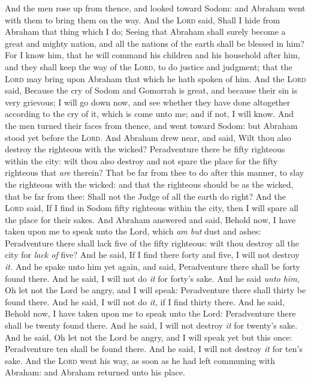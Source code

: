\documentclass[11pt,letterpaper,oneside]{memoir}
\begin{document}
And the men rose up from thence, and looked toward Sodom: and Abraham
went with them to bring them on the way. And the \textsc{Lord} said, Shall
I hide from Abraham that thing which I do; Seeing that Abraham shall
surely become a great and mighty nation, and all the nations of the
earth shall be blessed in him? For I know him, that he will command his
children and his household after him, and they shall keep the way of the
\textsc{Lord}, to do justice and judgment; that the \textsc{Lord} may bring
upon Abraham that which he hath spoken of him. And the \textsc{Lord} said,
Because the cry of Sodom and Gomorrah is great, and because their sin is
very grievous; I will go down now, and see whether they have done
altogether according to the cry of it, which is come unto me; and if
not, I will know. And the men turned their faces from thence, and went
toward Sodom: but Abraham stood yet before the \textsc{Lord}. And Abraham
drew near, and said, Wilt thou also destroy the righteous with the
wicked? Peradventure there be fifty righteous within the city: wilt thou
also destroy and not spare the place for the fifty righteous that
\emph{are} therein? That be far from thee to do after this manner, to
slay the righteous with the wicked: and that the righteous should be as
the wicked, that be far from thee: Shall not the Judge of all the earth
do right? And the \textsc{Lord} said, If I find in Sodom fifty righteous
within the city, then I will spare all the place for their sakes. And
Abraham answered and said, Behold now, I have taken upon me to speak
unto the Lord, which \emph{am but} dust and ashes: Peradventure there
shall lack five of the fifty righteous: wilt thou destroy all the city
for \emph{lack of} five? And he said, If I find there forty and five, I
will not destroy \emph{it. }And he spake unto him yet again, and said,
Peradventure there shall be forty found there. And he said, I will not
do \emph{it} for forty's sake. And he said \emph{unto him,} Oh let not the
Lord be angry, and I will speak: Peradventure there shall thirty be
found there. And he said, I will not do \emph{it,} if I find thirty
there. And he said, Behold now, I have taken upon me to speak unto the
Lord: Peradventure there shall be twenty found there. And he said, I
will not destroy \emph{it} for twenty's sake. And he said, Oh let not
the Lord be angry, and I will speak yet but this once: Peradventure ten
shall be found there. And he said, I will not destroy \emph{it} for
ten's sake. And the \textsc{Lord} went his way, as soon as he had left
communing with Abraham: and Abraham returned unto his place.
\end{document}
